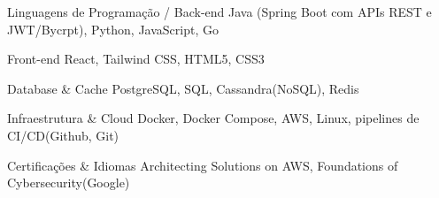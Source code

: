 

\begin{cvskills}

  \cvskill
    {Linguagens de Programação / Back-end}
    {Java (Spring Boot com APIs REST e JWT/Bycrpt), Python, JavaScript, Go}

  \cvskill
    {Front-end}
    {React, Tailwind CSS, HTML5, CSS3}

  \cvskill
    {Database \& Cache}
    {PostgreSQL, SQL, Cassandra(NoSQL), Redis}

  \cvskill
    {Infraestrutura \& Cloud}
    {Docker, Docker Compose, AWS, Linux, pipelines de CI/CD(Github, Git)}

  \cvskill
    {Certificações \& Idiomas}
    {Architecting Solutions on AWS, Foundations of Cybersecurity(Google)}

\end{cvskills}
